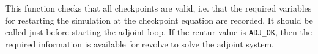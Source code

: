 This function checks that all checkpoints are valid, i.e. that the required variables for restarting the simulation at the checkpoint equation are recorded.
It should be called just before starting the adjoint loop.
If the reutur value is \texttt{ADJ_OK}, then the required information is available for revolve to solve the adjoint system.
